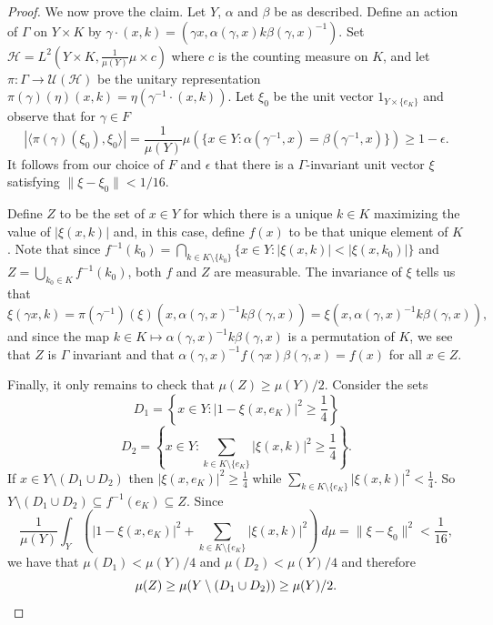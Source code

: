 \documentclass[12pt]{amsart}
\theoremstyle{definition}
\begin{document}
\begin{proof}
	We now prove the claim. Let $Y$, $\alpha$ and $\beta$ be as described. Define an action of $\Gamma$ on $Y \times K$ by $\gamma \cdot (x, k) = (\gamma x, \alpha(\gamma, x) k \beta(\gamma, x)^{-1})$. Set $\mathcal{H} = L^2(Y \times K, \frac{1}{\mu(Y)} \mu \times c)$ where $c$ is the counting measure on $K$, and let $\pi : \Gamma \rightarrow \mathcal{U}(\mathcal{H})$ be the unitary representation $\pi(\gamma)(\eta)(x,k) = \eta(\gamma^{-1} \cdot (x,k))$. Let $\xi_0$ be the unit vector $1_{Y \times \{e_K\}}$ and observe that for $\gamma \in F$
	$$|\langle \pi(\gamma)(\xi_0), \xi_0 \rangle| = \frac{1}{\mu(Y)} \mu(\{x \in Y : \alpha(\gamma^{-1}, x) = \beta(\gamma^{-1}, x)\}) \geq 1-\epsilon.$$
	It follows from our choice of $F$ and $\epsilon$ that there is a $\Gamma$-invariant unit vector $\xi$ satisfying $\|\xi - \xi_0\| < 1/16$.
	
	Define $Z$ to be the set of $x \in Y$ for which there is a unique $k \in K$ maximizing the value of $|\xi(x,k)|$ and, in this case, define $f(x)$ to be that unique element of $K$. Note that since $f^{-1}(k_0) = \bigcap_{k \in K \setminus \{k_0\}} \{x \in Y : |\xi(x,k)| < |\xi(x,k_0)|\}$ and $Z = \bigcup_{k_0 \in K} f^{-1}(k_0)$, both $f$ and $Z$ are measurable. The invariance of $\xi$ tells us that
	$$\xi(\gamma x, k) = \pi(\gamma^{-1})(\xi)(x, \alpha(\gamma,x)^{-1} k \beta(\gamma,x)) = \xi(x, \alpha(\gamma,x)^{-1} k \beta(\gamma, x)),$$
	and since the map $k \in K \mapsto \alpha(\gamma,x)^{-1} k \beta(\gamma, x)$ is a permutation of $K$, we see that $Z$ is $\Gamma$ invariant and that $\alpha(\gamma,x)^{-1} f(\gamma x) \beta(\gamma, x) = f(x)$ for all $x \in Z$.
	
	Finally, it only remains to check that $\mu(Z) \geq \mu(Y) / 2$. Consider the sets
	$$D_1 = \left\{x \in Y : |1 - \xi(x,e_K)|^2 \geq \frac{1}{4} \right\}$$
	$$D_2 = \left\{x \in Y : \sum_{k \in K \setminus \{e_K\}} |\xi(x,k)|^2 \geq \frac{1}{4} \right\}.$$
	If $x \in Y \setminus (D_1 \cup D_2)$ then $|\xi(x,e_K)|^2 \geq \frac{1}{4}$ while $\sum_{k \in K \setminus \{e_K\}} |\xi(x,k)|^2 < \frac{1}{4}$. So $Y \setminus (D_1 \cup D_2) \subseteq f^{-1}(e_K) \subseteq Z$. Since
	$$\frac{1}{\mu(Y)} \int_Y \left(|1-\xi(x,e_K)|^2 + \sum_{k \in K \setminus \{e_K\}} |\xi(x,k)|^2\right) \ d \mu = \|\xi - \xi_0\|^2 < \frac{1}{16},$$
	we have that $\mu(D_1) < \mu(Y) / 4$ and $\mu(D_2) < \mu(Y) / 4$ and therefore
	\begin{equation*}
		\mu(Z) \geq \mu(Y \setminus (D_1 \cup D_2)) \geq \mu(Y) / 2.\qedhere
	\end{equation*}
\end{proof}
\end{document}
